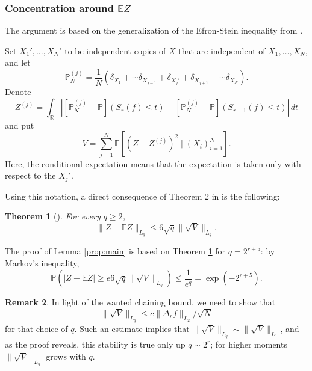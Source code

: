 \documentclass[11pt]{amsart}
\newcommand{\R}{\mathbb{R}}
\newtheorem{theorem}{Theorem}[section]
\theoremstyle{definition}
\newtheorem{remark}[theorem]{Remark}
\newcommand{\E}{\mathbb{E}}
\renewcommand{\P}{\mathbb{P}}
\numberwithin{equation}{section}
\begin{document}
\subsubsection{Concentration around $\E Z$}


The argument is based on the generalization of the Efron-Stein inequality from \cite{boucheron2005moment}.

Set  $X_{1}',\dots,X_{N}'$ to be independent copies of $X$ that are independent of $X_{1},\dots,X_{N}$, and let
\[\P^{(j)}_{N} = \frac{1}{N} \left( \delta_{X_{1}}+ \cdots \delta_{X_{j-1}}+\delta_{X_{j}'} + \delta_{X_{j+1}}+\cdots \delta_{X_{N}}\right).\]
Denote
\[ Z^{(j)} = \int_{\R} \left| [\P^{(j)}_{N}-\P]( S_{r}(f) \leq t)  - [\P^{(j)}_{N}-\P]( S_{r-1}(f) \leq t) \right| \,dt \]
and put 
\[V=\sum_{j=1}^{N} \E\left[ \left(Z-Z^{(j)} \right)^{2} \mid (X_{i})_{i=1}^{N} \right].\]
Here, the conditional expectation  means that the expectation is taken only with respect to the  $X_j'$.

Using this notation, a direct consequence of Theorem 2 in \cite{boucheron2005moment} is the following:

\begin{theorem}[{\cite[Theorem 2]{boucheron2005moment}}]
\label{thm:BBLM}
For every $q\geq 2$,
\[ \|Z - \E Z\|_{L_{q}}
\leq 6 \sqrt{q} \|\sqrt V\|_{L_{q}}.\]
\end{theorem}

The proof of Lemma \ref{prop:main} is based on Theorem \ref{thm:BBLM} for $q=2^{r+5}$: by Markov's inequality,
\[ \P\left(|Z-\E Z | \geq e 6 \sqrt{q} \|\sqrt V\|_{L_{q}} \right) 
\leq \frac{1}{e^{q}} = \exp(-2^{r+5}).\]

\begin{remark}
In light of the wanted chaining bound, we need to show that 
\[ \|\sqrt V\|_{L_{q}} \leq c \|\Delta_{r} f\|_{L_{2}}/\sqrt{N}\]
 for that choice of $q$.
Such an estimate implies that  $\|\sqrt V\|_{L_{q}}\sim \|\sqrt V\|_{L_{1}}$, and as the proof reveals, this stability is true only up $q\sim 2^{r}$; for higher moments $\|\sqrt V\|_{L_{q}}$ grows with $q$.
\end{remark}
\end{document}
